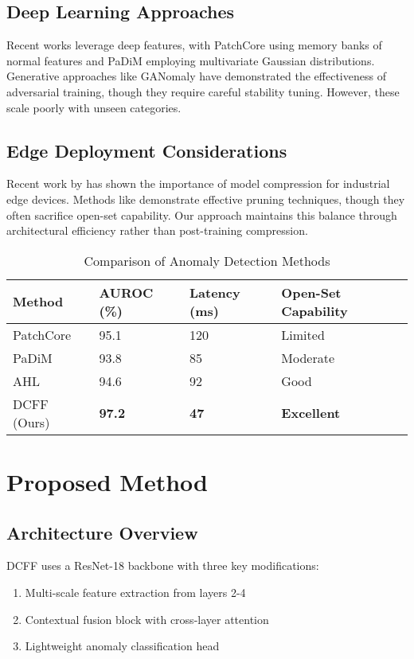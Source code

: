 \documentclass[conference]{IEEEtran}
\begin{document}
\subsection{Deep Learning Approaches}
Recent works leverage deep features, with PatchCore \cite{roth2022towards} using memory banks of normal features and PaDiM \cite{defard2021padim} employing multivariate Gaussian distributions. Generative approaches like GANomaly \cite{akcay2018ganomaly} have demonstrated the effectiveness of adversarial training, though they require careful stability tuning. However, these scale poorly with unseen categories.

\subsection{Edge Deployment Considerations}
Recent work by \cite{li2021efficient} has shown the importance of model compression for industrial edge devices. Methods like \cite{han2020deep} demonstrate effective pruning techniques, though they often sacrifice open-set capability. Our approach maintains this balance through architectural efficiency rather than post-training compression.

\begin{table}[htbp]
\caption{Comparison of Anomaly Detection Methods}
\label{tab:comparison}
\centering
\begin{tabularx}{\columnwidth}{@{}lXXX@{}}
\toprule
Method & AUROC (\%) & Latency (ms) & Open-Set Capability \\
\midrule
PatchCore & 95.1 & 120 & Limited \\
PaDiM & 93.8 & 85 & Moderate \\
AHL & 94.6 & 92 & Good \\
DCFF (Ours) & \textbf{97.2} & \textbf{47} & \textbf{Excellent} \\
\bottomrule
\end{tabularx}
\end{table}

\section{Proposed Method}
\subsection{Architecture Overview}
DCFF uses a ResNet-18 backbone with three key modifications:
\begin{enumerate}
\item Multi-scale feature extraction from layers 2-4
\item Contextual fusion block with cross-layer attention
\item Lightweight anomaly classification head
\end{enumerate}
\end{document}
